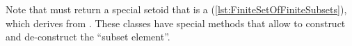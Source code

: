 


Note that  must return a special setoid that is a  (\cref{lst:FiniteSetOfFiniteSubsets}), which derives from .
These classes have special methods that allow to construct and de-construct the ``subset element''.

